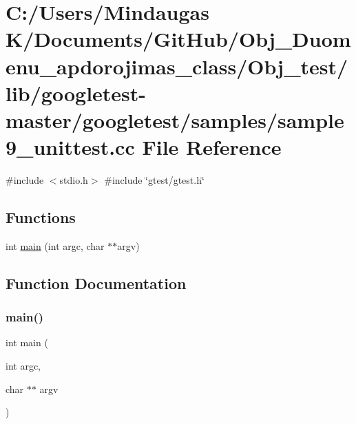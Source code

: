 \hypertarget{_obj__test_2lib_2googletest-master_2googletest_2samples_2sample9__unittest_8cc}{}\section{C\+:/\+Users/\+Mindaugas K/\+Documents/\+Git\+Hub/\+Obj\+\_\+\+Duomenu\+\_\+apdorojimas\+\_\+class/\+Obj\+\_\+test/lib/googletest-\/master/googletest/samples/sample9\+\_\+unittest.cc File Reference}
\label{_obj__test_2lib_2googletest-master_2googletest_2samples_2sample9__unittest_8cc}
{\ttfamily \#include $<$stdio.\+h$>$}\newline
{\ttfamily \#include \char`\"{}gtest/gtest.\+h\char`\"{}}\newline
\subsection*{Functions}
\begin{DoxyCompactItemize}
\item 
int \mbox{\hyperlink{_obj__test_2lib_2googletest-master_2googletest_2samples_2sample9__unittest_8cc_a3c04138a5bfe5d72780bb7e82a18e627}{main}} (int argc, char $\ast$$\ast$argv)
\end{DoxyCompactItemize}


\subsection{Function Documentation}
\mbox{\label{_obj__test_2lib_2googletest-master_2googletest_2samples_2sample9__unittest_8cc_a3c04138a5bfe5d72780bb7e82a18e627}} 
\subsubsection{\texorpdfstring{main()}{main()}}
{\footnotesize\ttfamily int main (\begin{DoxyParamCaption}\item[{int}]{argc,  }\item[{char $\ast$$\ast$}]{argv }\end{DoxyParamCaption})}


